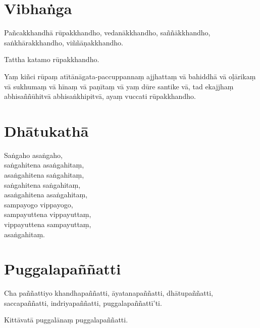 


\section{Vibhaṅga}

Pañcakkhandhā rūpakkhandho, vedanākkhandho, saññākkhandho, saṅkhārakkhandho,
viññāṇakkhandho.

Tattha katamo rūpakkhandho.

Yaṃ kiñci rūpaṃ atītānāgata-paccuppannaṃ ajjhattaṃ vā bahiddhā vā oḷārikaṃ vā
sukhumaṃ vā hīnaṃ vā paṇītaṃ vā yaṃ dūre santike vā, tad ekajjhaṃ
abhisaññūhitvā abhisaṅkhipitvā, ayaṃ vuccati rūpakkhandho.



\clearpage

\section{Dhātukathā}

Saṅgaho asaṅgaho,\\
saṅgahitena asaṅgahitaṃ,\\
asaṅgahitena saṅgahitaṃ,\\
saṅgahitena saṅgahitaṃ,\\
asaṅgahitena asaṅgahitaṃ,\\
sampayogo vippayogo,\\
sampayuttena vippayuttaṃ,\\
vippayuttena sampayuttaṃ,\\
asaṅgahitaṃ.



\section{Puggalapaññatti}

Cha paññattiyo khandhapaññatti, āyatanapaññatti, dhātupaññatti, saccapaññatti,
indriyapaññatti, puggalapaññattī'ti.

Kittāvatā puggalānaṃ puggalapaññatti.

